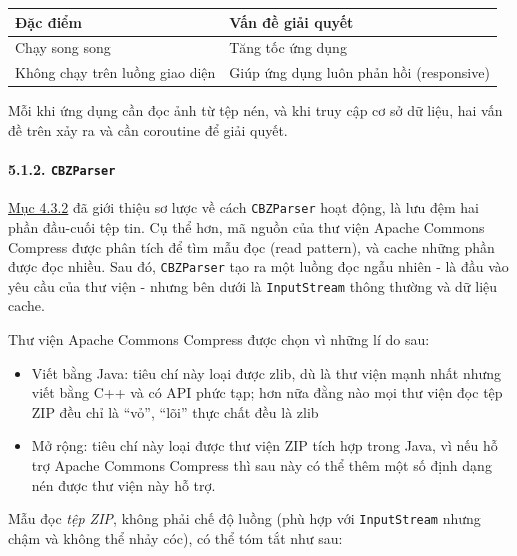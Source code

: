 \documentclass[
]{article}
\providecommand{\tightlist}{%
  \setlength{\itemsep}{0pt}\setlength{\parskip}{0pt}}
\begin{document}
\begin{longtable}[]{@{}ll@{}}
\toprule
Đặc điểm & Vấn đề giải quyết \\
\midrule
\endhead
Chạy song song & Tăng tốc ứng dụng \\
Không chạy trên luồng giao diện & Giúp ứng dụng luôn phản hồi
(responsive) \\
\bottomrule
\end{longtable}

Mỗi khi ứng dụng cần đọc ảnh từ tệp nén, và khi truy cập cơ sở dữ liệu,
hai vấn đề trên xảy ra và cần coroutine để giải quyết.

\hypertarget{cbzparser}{%
\paragraph{\texorpdfstring{5.1.2.
\texttt{CBZParser}}{5.1.2. CBZParser}}\label{cbzparser}}

\protect\hyperlink{P4.3.2-cbzparser}{Mục 4.3.2} đã giới thiệu sơ lược về
cách \texttt{CBZParser} hoạt động, là lưu đệm hai phần đầu-cuối tệp tin.
Cụ thể hơn, mã nguồn của thư viện Apache Commons Compress được phân tích
để tìm mẫu đọc (read pattern), và cache những phần được đọc nhiều. Sau
đó, \texttt{CBZParser} tạo ra một luồng đọc ngẫu nhiên - là đầu vào yêu
cầu của thư viện - nhưng bên dưới là \texttt{InputStream} thông thường
và dữ liệu cache.

Thư viện Apache Commons Compress được chọn vì những lí do sau:

\begin{itemize}
\tightlist
\item
  Viết bằng Java: tiêu chí này loại được zlib, dù là thư viện mạnh nhất
  nhưng viết bằng C++ và có API phức tạp; hơn nữa đằng nào mọi thư viện
  đọc tệp ZIP đều chỉ là ``vỏ'', ``lõi'' thực chất đều là zlib
\item
  Mở rộng: tiêu chí này loại được thư viện ZIP tích hợp trong Java, vì
  nếu hỗ trợ Apache Commons Compress thì sau này có thể thêm một số định
  dạng nén được thư viện này hỗ trợ.
\end{itemize}

Mẫu đọc \emph{tệp ZIP}, không phải chế độ luồng (phù hợp với
\texttt{InputStream} nhưng chậm và không thể nhảy cóc), có thể tóm tắt
như sau:
\end{document}
